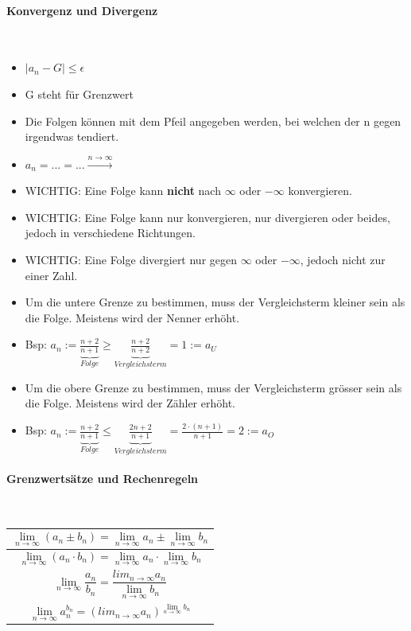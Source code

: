 \paragraph{Konvergenz und Divergenz}\mbox{}\\
\begin{itemize}
    \item $|a_{n} - G| \leq \epsilon $
    \item G steht für Grenzwert
    \item Die Folgen können mit dem Pfeil angegeben werden, bei welchen der n gegen irgendwas tendiert.
    \item $a_n = ... = ... \xrightarrow{n \rightarrow \infty}$
    \item WICHTIG: Eine Folge kann \textbf{nicht} nach $\infty$ oder $-\infty$ konvergieren.
    \item WICHTIG: Eine Folge kann nur konvergieren, nur divergieren oder beides, jedoch in verschiedene Richtungen.
    \item WICHTIG: Eine Folge divergiert nur gegen $\infty$ oder $-\infty$, jedoch nicht zur einer Zahl.
    \item Um die untere Grenze zu bestimmen, muss der Vergleichsterm kleiner sein als die Folge. Meistens wird der Nenner erhöht.
    \item Bsp: $a_n := \underbrace{\frac{n+2}{n+1}}_{Folge} \geq \underbrace{\frac{n+2}{n+2}}_{Vergleichsterm} = 1 := a_U$
    \item Um die obere Grenze zu bestimmen, muss der Vergleichsterm grösser sein als die Folge. Meistens wird der Zähler erhöht.
    \item Bsp: $a_n := \underbrace{\frac{n+2}{n+1}}_{Folge} \leq \underbrace{\frac{2n+2}{n+1}}_{Vergleichsterm} = \frac{2 \cdot (n+1)}{n+1} = 2 := a_O$
\end{itemize}
\vspace{1mm}

\paragraph{Grenzwertsätze und Rechenregeln}\mbox{}\\
\noindent
\begin{tabularx}{\columnwidth}{@{}X@{}}
    \hline
    \[ \lim_{n \to \infty} (a_n \pm b_n ) = \lim_{n \to \infty} a_n \pm \lim_{n \to \infty} b_n \]       \\ \hline
    \[ \lim_{n \to \infty} (a_n \cdot b_n ) = \lim_{n \to \infty} a_n \cdot \lim_{n \to \infty} b_n \]   \\ \hline
    \[ \lim_{n \to \infty}  \frac{a_n}{b_n} = \frac{lim_{n \to \infty} a_n}{\lim_{n \to \infty} b_n} \]  \\ \hline
    \[ \lim_{n \to \infty} a_n^{b_n} = \left( lim_{n \to \infty} a_n\right)^{\lim_{n \to \infty} b_n} \] \\ \hline
\end{tabularx}
\vspace{1mm}

